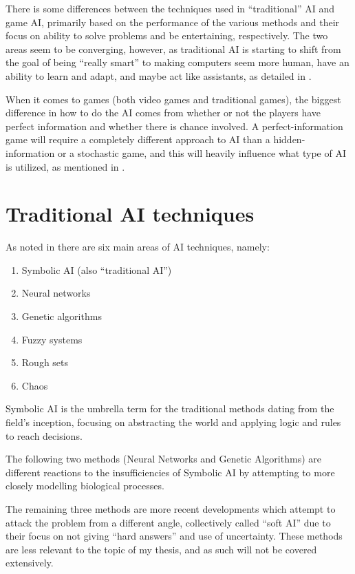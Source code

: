 \documentclass[]{report}
\begin{document}
There is some differences between the techniques used in ``traditional'' AI and
game AI, primarily based on the performance of the various methods and their
focus on ability to solve problems and be entertaining, respectively. The two
areas seem to be converging, however, as traditional AI is starting to shift
from the goal of being ``really smart'' to making computers seem more human,
have an ability to learn and adapt, and maybe act like assistants, as detailed
in \citet[][]{ramos2008guest}.

When it comes to games (both video games and traditional games), the biggest
difference in how to do the AI comes from whether or not the players have
perfect information and whether there is chance involved. A perfect-information
game will require a completely different approach to AI than a
hidden-information or a stochastic game, and this will heavily influence what
type of AI is utilized, as mentioned in \citet[pg.~4-5]{schaeffer2002games}.

\section{Traditional AI techniques}
\label{sec:trad-ai-techn}

As noted in \citet[chap.~1]{munakata2008fundamentals} there are six main areas
of AI techniques, namely:

\begin{enumerate}
\item Symbolic AI (also ``traditional AI'')
\item Neural networks
\item Genetic algorithms
\item Fuzzy systems
\item Rough sets
\item Chaos
\end{enumerate}

Symbolic AI is the umbrella term for the traditional methods dating from the
field's inception, focusing on abstracting the world and applying logic and
rules to reach decisions.

The following two methods (Neural Networks and Genetic Algorithms) are different
reactions to the insufficiencies of Symbolic AI by attempting to more closely
modelling biological processes.

The remaining three methods are more recent developments which attempt to attack
the problem from a different angle, collectively called ``soft AI'' due to their
focus on not giving ``hard answers'' and use of uncertainty. These methods are
less relevant to the topic of my thesis, and as such will not be covered
extensively.
\end{document}
